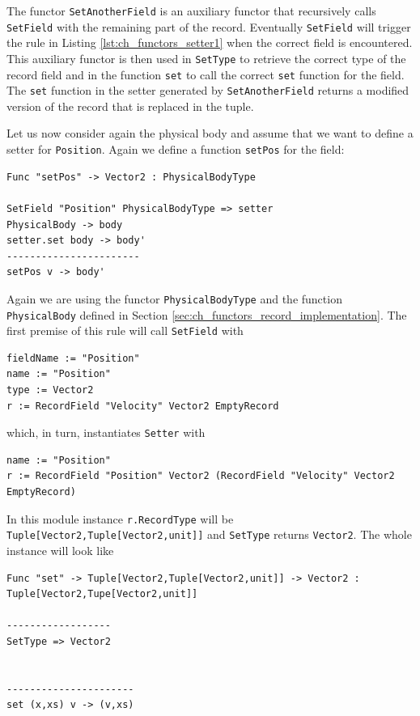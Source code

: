 \noindent
The functor \texttt{SetAnotherField} is an auxiliary functor that recursively calls \texttt{SetField} with the remaining part of the record. Eventually \texttt{SetField} will trigger the rule in Listing \ref{lst:ch_functors_setter1} when the correct field is encountered. This auxiliary functor is then used in \texttt{SetType} to retrieve the correct type of the record field and in the function \texttt{set} to call the correct \texttt{set} function for the field. The \texttt{set} function in the setter generated by \texttt{SetAnotherField} returns a modified version of the record that is replaced in the tuple.

Let us now consider again the physical body and assume that we want to define a setter for \texttt{Position}. Again we define a function \texttt{setPos} for the field:

\begin{lstlisting}
Func "setPos" -> Vector2 : PhysicalBodyType

SetField "Position" PhysicalBodyType => setter
PhysicalBody -> body
setter.set body -> body'
-----------------------
setPos v -> body'
\end{lstlisting}

\noindent
Again we are using the functor \texttt{PhysicalBodyType} and the function\\ \texttt{PhysicalBody} defined in Section \ref{sec:ch_functors_record_implementation}. The first premise of this rule will call \texttt{SetField} with

\begin{lstlisting}
fieldName := "Position"
name := "Position"
type := Vector2
r := RecordField "Velocity" Vector2 EmptyRecord
\end{lstlisting}

\noindent
which, in turn, instantiates \texttt{Setter} with 

\begin{lstlisting}
name := "Position"
r := RecordField "Position" Vector2 (RecordField "Velocity" Vector2 EmptyRecord)
\end{lstlisting}

\noindent
In this module instance \texttt{r.RecordType} will be\\ \texttt{Tuple[Vector2,Tuple[Vector2,unit]]} and \texttt{SetType} returns \texttt{Vector2}. The whole instance will look like

\begin{lstlisting}
Func "set" -> Tuple[Vector2,Tuple[Vector2,unit]] -> Vector2 : Tuple[Vector2,Tupe[Vector2,unit]]

------------------
SetType => Vector2


----------------------
set (x,xs) v -> (v,xs)
\end{lstlisting}

